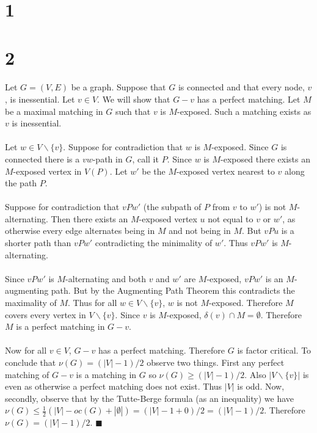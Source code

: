 \documentclass[letterpaper,12pt,oneside,onecolumn]{report}
\begin{document}
\section*{1}

\section*{2}
\paragraph{}
Let $G = (V,E)$ be a graph. Suppose that $G$ is connected and that every node, $v$, is inessential. Let $v \in V$. We will show that $G-v$ has a perfect matching. Let $M$ be a maximal matching in $G$ such that $v$ is $M$-exposed. Such a matching exists as $v$ is inessential. 
\paragraph{}
Let $w\in V\backslash \{v\}$. Suppose for contradiction that $w$ is $M$-exposed. Since $G$ is connected there is a $vw$-path in $G$, call it $P$. Since $w$ is $M$-exposed there exists an $M$-exposed vertex in $V(P)$. Let $w'$ be the $M$-exposed vertex nearest to $v$ along the path $P$.
\paragraph{}
Suppose for contradiction that $vPw'$ (the subpath of $P$ from $v$ to $w'$) is not $M$-alternating. Then there exists an $M$-exposed vertex $u$ not equal to $v$ or $w'$, as otherwise every edge alternates being in $M$ and not being in $M$. But $vPu$ is a shorter path than $vPw'$ contradicting the minimality of $w'$. Thus $vPw'$ is $M$-alternating.
\paragraph{}
Since $vPw'$ is $M$-alternating and both $v$ and $w'$ are $M$-exposed, $vPw'$ is an $M$-augmenting path. But by the Augmenting Path Theorem this contradicts the maximality of $M$. Thus for all $w \in V\backslash \{v\}$, $w$ is not $M$-exposed. Therefore $M$ covers every vertex in $V\backslash \{v\}$. Since $v$ is $M$-exposed, $\delta(v) \cap M = \emptyset$. Therefore $M$ is a perfect matching in $G-v$.
\paragraph{}
Now for all $v \in V$, $G-v$ has a perfect matching. Therefore $G$ is factor critical. To conclude that $\nu(G) = (|V| - 1)/2$ observe two things. First any perfect matching of $G-v$ is a matching in $G$ so $\nu(G) \geq (|V|-1)/2$. Also $|V\backslash \{v\}|$ is even as otherwise a perfect matching does not exist. Thus $|V|$ is odd. Now, secondly, observe that by the Tutte-Berge formula (as an inequality) we have $\nu(G) \leq \frac{1}{2}(|V| - oc(G) + |\emptyset|) = (|V| - 1 + 0)/2 = (|V| - 1)/2$. Therefore $\nu(G) = (|V|-1)/2$. $\blacksquare$
\end{document}
